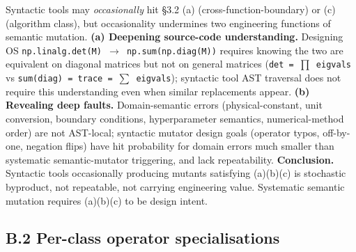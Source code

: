 \documentclass[acmsmall,screen,review]{acmart}
\begin{document}
Syntactic tools may \emph{occasionally} hit §3.2 (a)
(cross-function-boundary) or (c) (algorithm class), but occasionality
undermines two engineering functions of semantic mutation. \textbf{(a)
Deepening source-code understanding.} Designing OS
\texttt{np.linalg.det(M)\ $\to$\ np.sum(np.diag(M))} requires knowing the
two are equivalent on diagonal matrices but not on general matrices
(\texttt{det\ =\ $\prod$\ eigvals} vs
\texttt{sum(diag)\ =\ trace\ =\ $\sum$\ eigvals}); syntactic tool AST
traversal does not require this understanding even when similar
replacements appear. \textbf{(b) Revealing deep faults.}
Domain-semantic errors (physical-constant, unit conversion, boundary
conditions, hyperparameter semantics, numerical-method order) are not
AST-local; syntactic mutator design goals (operator typos, off-by-one,
negation flips) have hit probability for domain errors much smaller than
systematic semantic-mutator triggering, and lack repeatability.
\textbf{Conclusion.} Syntactic tools occasionally producing mutants
satisfying (a)(b)(c) is stochastic byproduct, not repeatable, not
carrying engineering value. Systematic semantic mutation requires
(a)(b)(c) to be design intent.

\subsection{B.2 Per-class operator specialisations}\label{b.2-per-class-operator-specialisations}
\end{document}
